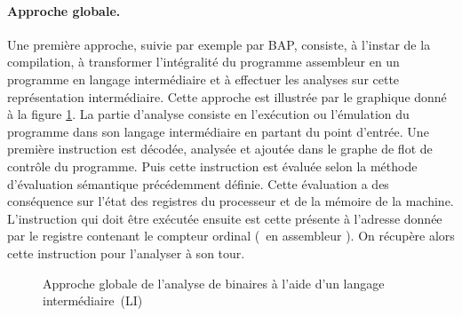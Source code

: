 \paragraph{Approche globale.}
Une première approche, suivie par exemple par BAP, consiste, à l'instar de la compilation, à transformer l'intégralité du programme assembleur en un programme en langage intermédiaire et à effectuer les analyses sur cette représentation intermédiaire.
Cette approche est illustrée par le graphique donné à la figure \ref{fig:diag_approche_globale}. La partie d'analyse consiste en l'exécution ou l'émulation du programme dans son langage intermédiaire en partant du point d'entrée.
Une première instruction est décodée, analysée et ajoutée dans le graphe de flot de contrôle du programme. Puis cette instruction est évaluée selon la méthode d'évaluation sémantique précédemment définie.
Cette évaluation a des conséquence sur l'état des registres du processeur et de la mémoire de la machine.
L'instruction qui doit être exécutée ensuite est cette présente à l'adresse donnée par le registre contenant le compteur ordinal (\eip\ en assembleur \xq). On récupère alors cette instruction pour l'analyser à son tour.

\begin{figure}[h]
\begin{center}
\end{center}
\caption{Approche globale de l'analyse de binaires à l'aide d'un langage intermédiaire~(LI)}
\label{fig:diag_approche_globale}
\end{figure}


